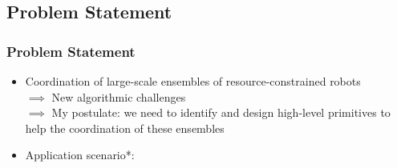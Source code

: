 \subsection{Problem Statement}

\begin{frame} \frametitle{Problem Statement}

{
\begin{itemize}
\item<1-> Coordination of large-scale ensembles of resource-constrained robots\\
\textcolor{femtostdarkblue}{$\implies$ New algorithmic challenges}\\
\textcolor{femtostdarkblue}{$\implies$ My postulate: we need to identify and design high-level primitives to help the coordination of these ensembles}
\item<2-> Application scenario*:


\end{itemize}}
\end{frame}
